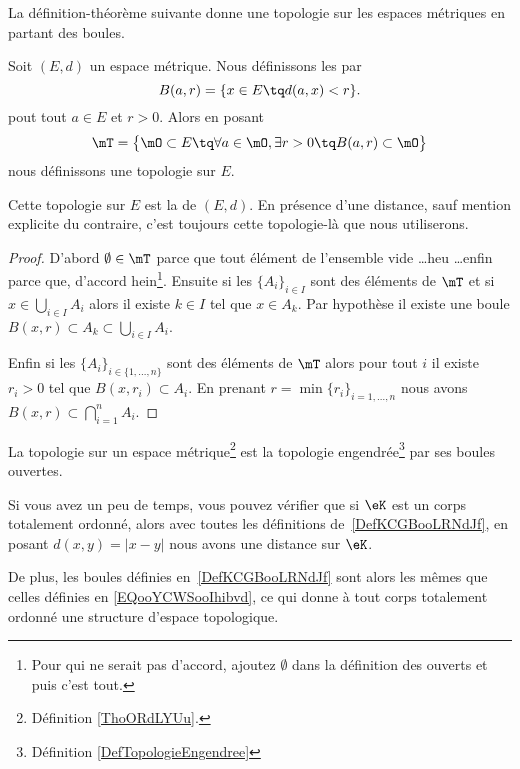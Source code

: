 La définition-théorème suivante donne une topologie sur les espaces métriques en partant des boules.

\begin{theoremDef}     \label{ThoORdLYUu}
	Soit \( (E,d)\) un espace métrique. Nous définissons les  par
	\begin{equation}        \label{EQooYCWSooIhibvd}
		B(a,r)=\{ x\in E\tq d(a,x)<r \}.
	\end{equation}
	pout tout \( a\in E\) et \( r>0\).
	Alors en posant
	\begin{equation}        \label{EqGDVVooDZfwSf}
		\mT=\big\{  \mO\subset E  \tq\forall a\in \mO,\exists r>0\tq B(a,r)\subset \mO \big\}
	\end{equation}
	nous définissons une topologie sur \( E\).

	Cette topologie sur \( E\) est la  de \( (E,d)\). En présence d'une distance, sauf mention explicite du contraire, c'est toujours cette topologie-là que nous utiliserons.
\end{theoremDef}

\begin{proof}
	D'abord \( \emptyset\in\mT\) parce que tout élément de l'ensemble vide \ldots heu \ldots enfin parce que, d'accord hein\footnote{Pour qui ne serait pas d'accord, ajoutez \( \emptyset\) dans la définition des ouverts et puis c'est tout.}. Ensuite si les \( \{A_i\}_{i\in I}\) sont des éléments de \( \mT\) et si \( x\in\bigcup_{i\in I}A_i\) alors il existe \( k\in I\) tel que \( x\in A_k\). Par hypothèse il existe une boule \( B(x,r)\subset A_k\subset\bigcup_{i\in I}A_i\).

	Enfin si les \( \{A_i\}_{i\in\{ 1,\ldots, n \}}\) sont des éléments de \( \mT\) alors pour tout \( i\) il existe \( r_i>0\) tel que \( B(x,r_i)\subset A_i\). En prenant \( r=\min\{ r_i \}_{i=1,\ldots, n}\) nous avons $B(x,r)\subset\bigcap_{i=1}^nA_i.$
\end{proof}

\begin{proposition}     \label{PROPooZXTXooEMLgMn}
	La topologie sur un espace métrique\footnote{Définition \ref{ThoORdLYUu}.} est la topologie engendrée\footnote{Définition \ref{DefTopologieEngendree}} par ses boules ouvertes.
\end{proposition}

\begin{normaltext}      \label{NORMooJBMXooLHfAJK}
	Si vous avez un peu de temps, vous pouvez vérifier que si \( \eK\) est un corps totalement ordonné, alors avec toutes les définitions de~\ref{DefKCGBooLRNdJf}, en posant \( d(x,y)=| x-y |\) nous avons une distance sur \( \eK\).

	De plus, les boules définies en~\ref{DefKCGBooLRNdJf} sont alors les mêmes que celles définies en \eqref{EQooYCWSooIhibvd}, ce qui donne à tout corps totalement ordonné une structure d'espace topologique.
\end{normaltext}

